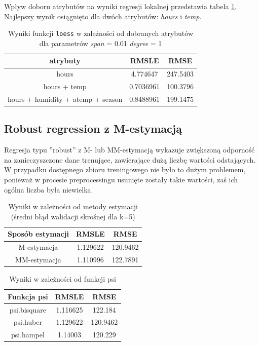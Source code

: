 \documentclass[a4paper,12pt]{article}
\begin{document}
        Wpływ doboru atrybutów na wyniki regresji lokalnej przedstawia tabela \ref{tab:loessAttr}. Najlepszy wynik osiągnięto dla dwóch atrybutów: \textit{hours} i \textit{temp}.
        
        \begin{table}
        	\centering
            \begin{tabular}{|c|c|c|}
                \hline 
                atrybuty & RMSLE & RMSE \\ 
                \hline 
                hours & 4.774647 & 247.5403 \\ 
                \hline 
                hours + temp & 0.7036961 & 100.3796 \\ 
                \hline 
                hours + humidity + atemp + season & 0.8488961 & 199.1475 \\ 
                \hline 
            \end{tabular}
            \caption{Wyniki funkcji \texttt{loess} w zależności od dobranych atrybutów dla parametrów \textit{span} = 0.01 \textit{degree} = 1}
            \label{tab:loessAttr}
        \end{table}
        
   \subsection{Robust regression z M-estymacją}
   
   Regresja typu ''robust'' z M- lub MM-estymacją wykazuje zwiększoną odporność na zanieczyszczone dane trenujące, zawierające dużą liczbę wartości odstających. W przypadku 
   dostępnego zbioru treningowego nie było to dużym problemem, ponieważ w procesie preprocessingu usunięte zostały takie wartości, zaś ich ogólna liczba była niewielka.
   
    \begin{table}
    \centering  
   \begin{tabular}{|c|c|c|}
   \hline
   Sposób estymacji & RMSLE & RMSE \\
   \hline
   M-estymacja & 1.129622 & 120.9462 \\
   \hline
   MM-estymacja & 1.110996 & 122.7891 \\
   \hline
   \end{tabular}
   \caption{Wyniki w zależności od metody estymacji (średni błąd walidacji skrośnej dla k=5)}
    \end{table}
    \begin{table}
    	\centering
            \begin{tabular}{|c|c|c|}
                \hline
                Funkcja psi & RMSLE & RMSE \\
                \hline
                psi.bisquare & 1.116625 & 122.184 \\
                \hline
                psi.huber & 1.129622 & 120.9462 \\
                \hline
                psi.hampel & 1.14003 & 120.229 \\
                \hline
            \end{tabular}
            \caption{Wyniki w zależności od funkcji psi}    
    \end{table}
    
\end{document}
